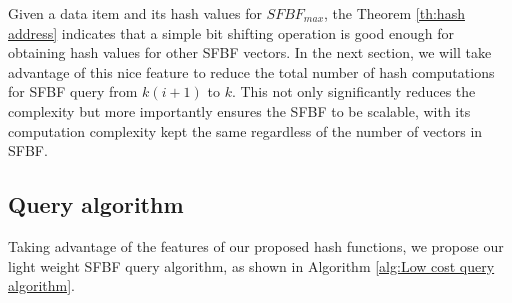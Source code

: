 \documentclass[10pt,journal,compsoc]{IEEEtran}
\begin{document}
Given a data item and its hash values for $SFBF_{max}$, the Theorem \ref{th:hash address} indicates that a simple
bit shifting operation is good enough for obtaining hash values for other SFBF vectors.
In the next section, we will take advantage of this nice feature  to reduce the total number of hash computations for SFBF query from $k(i+1)$ to $k$. This not only significantly reduces the complexity but more importantly ensures the SFBF to be scalable, with its computation complexity kept the same regardless of the number of vectors in SFBF.
\subsection{Query algorithm}
%

Taking advantage of the features of our proposed hash
functions, we propose our light weight SFBF query algorithm, as shown in Algorithm \ref{alg:Low cost query algorithm}.
\end{document}

